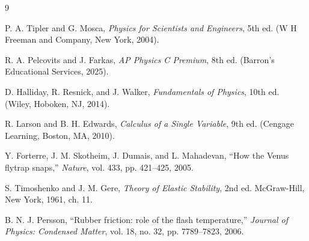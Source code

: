 \documentclass[12pt]{article}
\begin{document}
\begin{thebibliography}{9}

P. A. Tipler and G. Mosca, \textit{Physics for Scientists and Engineers}, 5th ed. (W H Freeman and Company, New York, 2004).

R. A. Pelcovits and J. Farkas, \textit{AP Physics C Premium}, 8th ed. (Barron’s Educational Services, 2025).

D. Halliday, R. Resnick, and J. Walker, \textit{Fundamentals of Physics}, 10th ed. (Wiley, Hoboken, NJ, 2014).

R. Larson and B. H. Edwards, \textit{Calculus of a Single Variable}, 9th ed. (Cengage Learning, Boston, MA, 2010).

Y. Forterre, J. M. Skotheim, J. Dumais, and L. Mahadevan, ``How the Venus flytrap snaps,'' \textit{Nature}, vol. 433, pp. 421--425, 2005.

S. Timoshenko and J. M. Gere, \textit{Theory of Elastic Stability}, 2nd ed. McGraw-Hill, New York, 1961, ch. 11.

B. N. J. Persson, ``Rubber friction: role of the flash temperature,'' \textit{Journal of Physics: Condensed Matter}, vol. 18, no. 32, pp. 7789--7823, 2006.

\end{thebibliography}
\end{document}
